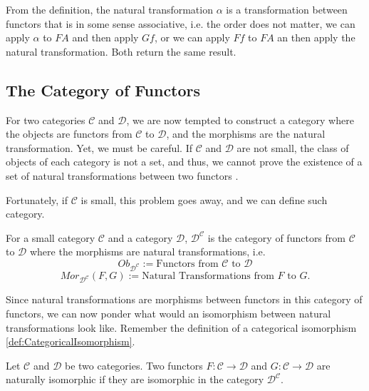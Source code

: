 From the definition, the natural transformation $\alpha$ is a transformation between functors
that is in some sense associative, i.e. the order does not matter, we can apply $\alpha$
to $FA$ and then apply $Gf$, or we can apply $Ff$ to $FA$ an then apply the natural transformation. Both
return the same result.

\subsection{The Category of Functors}

For two categories $\mathcal C$ and $\mathcal D$, we are now tempted to construct a category
where the objects are functors from $\mathcal C$ to $\mathcal D$, and the
morphisms are the natural transformation.
Yet, we must be careful. If $\mathcal C$ and $\mathcal D$ are not small, the
class of objects of each category is not a set, and thus, we cannot
prove the existence of a set of natural transformations between
two functors \citep{borceux1994handbook}.

Fortunately, if $\mathcal C$ is small, this problem goes away, and
we can define such category.

\begin{definition}
	For a small category $\mathcal C$ and a category $\mathcal D$,
	$\mathcal D^{\mathcal C}$ is the category of functors
	from $\mathcal C$ to $\mathcal D$ where the morphisms are natural transformations,
	i.e.
	\begin{displaymath}
		Ob_{\mathcal D^{\mathcal C}} :={\text{Functors from } \mathcal C \text{ to } \mathcal D}
	\end{displaymath}
	\begin{displaymath}
		Mor_{\mathcal D^{\mathcal C}}(F,G) :={\text{Natural Transformations from }
		F \text{ to } G}.
	\end{displaymath}
\end{definition}

Since natural transformations are morphisms between functors in this category of functors,
we can now ponder what would an isomorphism between natural transformations look like.
Remember the definition of a categorical isomorphism \ref{def:CategoricalIsomorphism}.

\begin{definition}
	Let $\mathcal C$ and $\mathcal D$ be two categories. Two functors
	$F:\mathcal C \to\mathcal D$ and $G:\mathcal C \to\mathcal D$
	are naturally isomorphic if they are isomorphic in the category $\mathcal D^\mathcal C$.
\end{definition}

